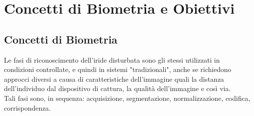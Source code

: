 \graphicspath{ {img/1/} }
\chapter{Concetti di Biometria e Obiettivi}\label{cap:biometria}
\thispagestyle{empty} %
\newpage
\section{Concetti di Biometria}
\vspace{8mm}
Le fasi di riconoscimento dell'iride disturbata sono gli stessi utilizzati in condizioni controllate, e quindi in sistemi "tradizionali", anche se richiedono approcci diversi a causa di caratteristiche dell'immagine quali la distanza dell'individuo dal dispositivo di cattura, la qualità dell'immagine e così via.\\
Tali fasi sono, in sequenza: acquisizione, segmentazione, normalizzazione, codifica, corrispondenza.

